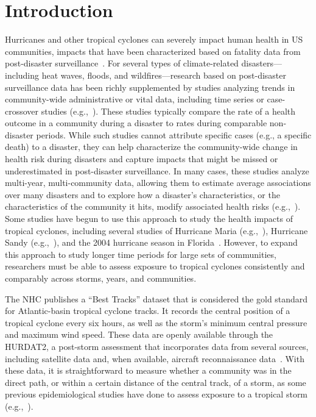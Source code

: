 \section*{Introduction}

\acresetall

Hurricanes and other tropical cyclones can severely impact human health in
\ac{US} communities, impacts that have been characterized based on fatality
data from post-disaster surveillance~\parencite{rappaport2000,
rappaport2014fatalities, rappaport2016fatalities, czajkowski2010fatal,
czajkowski2011, moore2012}.  For several types of climate-related
disasters---including heat waves, floods, and wildfires---research based on
post-disaster surveillance data has been richly supplemented by studies
analyzing trends in community-wide administrative or vital data, including time
series or case-crossover studies (e.g.,~\cite{anderson2010heat, son2012impact,
haikerwal2015impact, liu2017wildfire, milojevic2017mental}).  These studies
typically compare the rate of a health outcome in a community during a disaster
to rates during comparable non-disaster periods.  While such studies cannot
attribute specific cases (e.g., a specific death) to a disaster, they
can help characterize the community-wide change in health risk during disasters
and capture impacts that might be missed or underestimated in post-disaster
surveillance.  In many cases, these studies analyze multi-year, multi-community
data, allowing them to estimate average associations over many disasters and to
explore how a disaster's characteristics, or the characteristics of the
community it hits, modify associated health risks
(e.g.,~\cite{anderson2010heat, son2012impact, liu2017wildfire}).  Some studies
have begun to use this approach to study the health impacts of tropical
cyclones, including several studies of Hurricane Maria
(e.g.,~\cite{santos2018use, santos2018differential}), Hurricane Sandy
(e.g.,~\cite{kim2016, mongin2017, swerdel2014}), and the 2004 hurricane season
in Florida~\parencite{mckinney2011}.  However, to expand this approach to study
longer time periods for large sets of communities, researchers must be able to
assess exposure to tropical cyclones consistently and comparably across storms,
years, and communities.  

The \ac{NHC} publishes a ``Best Tracks'' dataset that is considered the gold
standard for Atlantic-basin tropical cyclone tracks.  It records the central
position of a tropical cyclone every six hours, as well as the storm's minimum
central pressure and maximum wind speed.  These data are openly available
through the \ac{HURDAT2}, a post-storm assessment that incorporates data from
several sources, including satellite data and, when available, aircraft
reconnaissance data~\parencite{landsea2013, jarvinen1988}.  With these data, it
is straightforward to measure whether a community was in the direct path, or
within a certain distance of the central track, of a storm, as some previous
epidemiological studies have done to assess exposure to a tropical storm
(e.g.,~\cite{currie2013, kinney2008, caillouet2008increase}).

